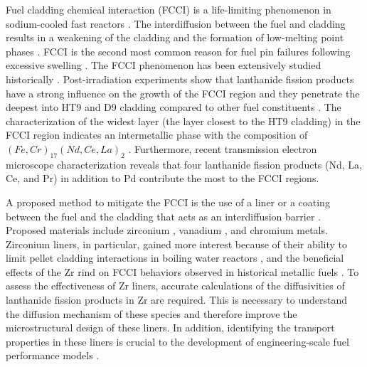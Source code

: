 \documentclass[preprint,12pt]{elsarticle}
\begin{document}
Fuel cladding chemical interaction (FCCI) is a life-limiting phenomenon in sodium-cooled fast reactors \cite{hofman_metallic_1997, pahl_experimental_1990, thomas2021nano}. The interdiffusion between the fuel and cladding results in a weakening of the cladding and the formation of low-melting point phases \cite{keiser_fuel_2019, keiser2009development}. FCCI is the second most common reason for fuel pin failures following excessive swelling \cite{hofman_metallic_1997,matthews_fuel-cladding_2017}. The FCCI phenomenon has been extensively studied historically \cite{keiser_fuel_2019}. Post-irradiation experiments show that lanthanide fission products have a strong influence on the growth of the FCCI region and they penetrate the deepest into HT9 and D9 cladding compared to other fuel constituents \cite{keiser_fuel_2019, keiser2009development}. The characterization of the widest layer (the layer closest to the HT9 cladding) in the FCCI region indicates an intermetallic phase with the composition of $(Fe, Cr)_{17}(Nd, Ce, La)_{2}$ \cite{keiser_fuel-cladding_2006, harp_scanning_2017}. Furthermore, recent transmission electron microscope characterization \cite{thomas_transmission_2023} reveals that four lanthanide fission products (Nd, La, Ce, and Pr) in addition to Pd contribute the most to the FCCI regions.

A proposed method to mitigate the FCCI is the use of a liner or a coating between the fuel and the cladding that acts as an interdiffusion barrier \cite{beausoleil_fast_2022,crawford_performance_1993, ryu_performance_2009, kim_performance_2009}. Proposed materials include zirconium \cite{jee_improvement_2013,lee_effect_2015, beausoleil_fast_2022}, vanadium \cite{lo_vanadium_2014}, and chromium \cite{yang_fcci_2010} metals. Zirconium liners, in particular, gained more interest because of their ability to limit pellet cladding interactions in boiling water reactors \cite{cox_pellet-clad_1990, chao_study_1993}, and the beneficial effects of the Zr rind on FCCI behaviors observed in historical metallic fuels \cite{keiser_fuel_2019, keiser2009development}. To assess the effectiveness of Zr liners, accurate calculations of the diffusivities of lanthanide fission products in Zr are required. This is necessary to understand the diffusion mechanism of these species and therefore improve the microstructural design of these liners. In addition, identifying the transport properties in these liners is crucial to the development of engineering-scale fuel performance models \cite{aagesen_mechanistic_2023}. 
\end{document}

